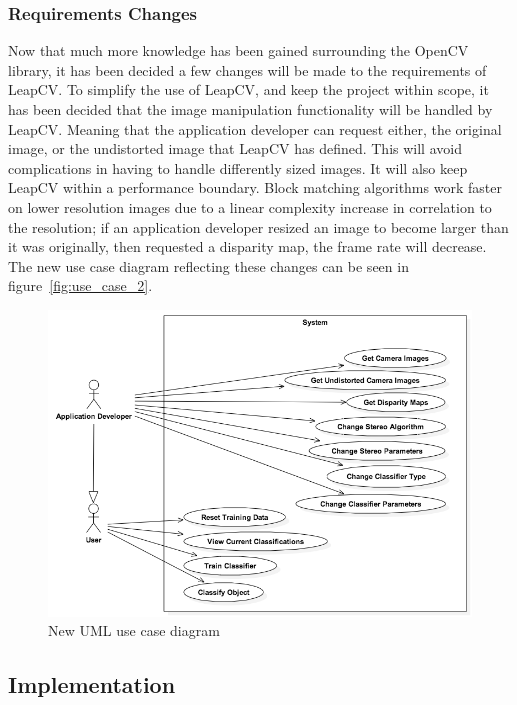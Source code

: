 \documentclass[11pt,oneside]{report}
\begin{document}
		\subsubsection{Requirements Changes}
			Now that much more knowledge has been gained surrounding the OpenCV library, it has been decided a few changes will be made to the requirements of LeapCV.
			To simplify the use of LeapCV, and keep the project within scope, it has been decided that the image manipulation functionality will be handled by LeapCV.
			Meaning that the application developer can request either, the original image, or the undistorted image that LeapCV has defined.
			This will avoid complications in having to handle differently sized images.
			It will also keep LeapCV within a performance boundary.
			Block matching algorithms work faster on lower resolution images due to a linear complexity increase in correlation to the resolution; if an application developer resized an image to become larger than it was originally, then requested a disparity map,  the frame rate will decrease.
			The new use case diagram reflecting these changes can be seen in figure~\ref{fig:use_case_2}.
			
			\begin{figure}
			\centering
    				\includegraphics[width=\textwidth]{use_case_2}
    			\caption{New UML use case diagram \protect {\label{fig:use_case_2}}}

			\end{figure}	
		\subsection{Implementation}
\end{document}
